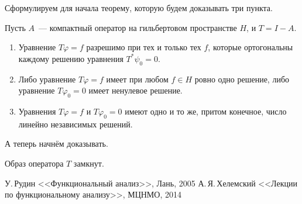 \documentclass{notes}
\begin{document}
	Сформулируем для начала теорему, которую будем доказывать три пункта.

	\begin{thm}
		Пусть $A$~--- компактный оператор на гильбертовом пространстве $H$, и $T = I - A$.
		\begin{enumerate}
			\item Уравнение $T\varphi = f$ разрешимо при тех и только тех $f$, которые ортогональны каждому решению уравнения $T^{*} \psi_0 = 0$.
			\item Либо уравнение $T \varphi = f$ имеет при любом $f \in H$ ровно одно решение, либо уравнение $T \varphi_0 = 0$ имеет ненулевое решение.
			\item Уравнения $T \varphi = f$ и $T \varphi_0 = 0$ имеют одно и то же, притом конечное, число линейно независимых решений.
		\end{enumerate}
	\end{thm}
		
	А теперь начнём доказывать.

	\begin{lm}
		Образ оператора $T$ замкнут.
	\end{lm}






\begin{thebibliography}{}

 У.$\,$Рудин <<Функциональный анализ>>, Лань, 2005
 А.$\,$Я.$\,$Хелемский <<Лекции по функциональному анализу>>, МЦНМО, 2014

\end{thebibliography}{}
\end{document}
